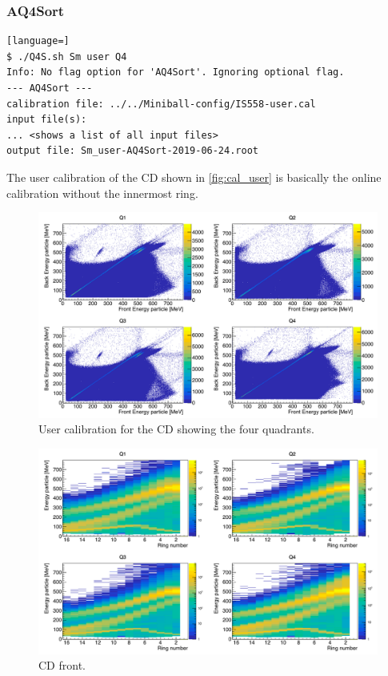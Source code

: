 \documentclass[twoside,english]{uiofysmaster/uiofysmaster}
\begin{document}
\subsubsection*{AQ4Sort}
\begin{lstlisting}[language=]
$ ./Q4S.sh Sm user Q4
Info: No flag option for 'AQ4Sort'. Ignoring optional flag.
--- AQ4Sort ---
calibration file: ../../Miniball-config/IS558-user.cal
input file(s):
... <shows a list of all input files>
output file: Sm_user-AQ4Sort-2019-06-24.root
\end{lstlisting}



The user calibration of the CD shown in \autoref{fig:cal_user} is basically the online calibration without the innermost ring. 

\begin{figure}[ht]
	\centering
	\includegraphics[width=\textwidth]{../Plots/plotting/E_f_b_Q1-4-user.png}
	\caption{User calibration for the CD showing the four quadrants.}
	\label{fig:cal_user}
\end{figure}


\begin{figure}[ht]
	\centering
	\includegraphics[width=\textwidth]{../Plots/plotting/E_vs_f-strip_all_Q.png}
	\caption{CD front.}
	\label{fig:cal_CD_front}
\end{figure}
\end{document}
